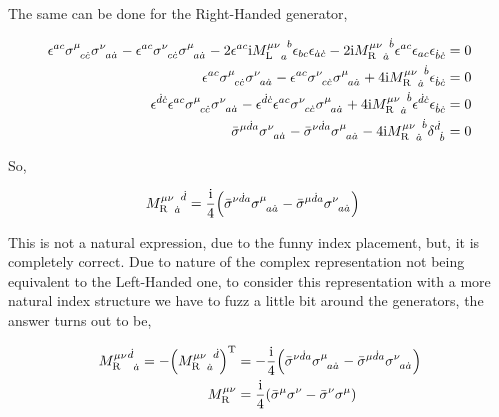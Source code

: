 The same can be done for the Right-Handed generator,

\begin{align}
    \epsilon^{ac}\tensor{\sigma}{^\mu_c_{\dot c}}\tensor{\sigma}{^\nu_a_{\dot a}}- \epsilon^{ac}\tensor{\sigma}{^\nu_c_{\dot c}}\tensor{\sigma}{^\mu_a_{\dot a}}-2\epsilon^{ac}\im\tensor{{{M_{\textnormal L}^{\mu\nu}}}}{_a^b}\epsilon_{bc}\epsilon_{\dot a\dot c}-2\im\tensor{{{M_{\textnormal R}^{\mu\nu}}}}{_{\dot a}^{\dot b}}\epsilon^{ac}\epsilon_{ac}\epsilon_{\dot b\dot c}&=0\nonumber\\
    \epsilon^{ac}\tensor{\sigma}{^\mu_c_{\dot c}}\tensor{\sigma}{^\nu_a_{\dot a}}- \epsilon^{ac}\tensor{\sigma}{^\nu_c_{\dot c}}\tensor{\sigma}{^\mu_a_{\dot a}}+4\im\tensor{{{M_{\textnormal R}^{\mu\nu}}}}{_{\dot a}^{\dot b}}\epsilon_{\dot b\dot c}&=0\nonumber\\
    \epsilon^{\dot d\dot c}\epsilon^{ac}\tensor{\sigma}{^\mu_c_{\dot c}}\tensor{\sigma}{^\nu_a_{\dot a}}- \epsilon^{\dot d\dot c}\epsilon^{ac}\tensor{\sigma}{^\nu_c_{\dot c}}\tensor{\sigma}{^\mu_a_{\dot a}}+4\im\tensor{{{M_{\textnormal R}^{\mu\nu}}}}{_{\dot a}^{\dot b}}\epsilon^{\dot d\dot c}\epsilon_{\dot b\dot c}&=0\nonumber\\
    \tensor{{\bar\sigma}}{^\mu^{\dot d}^a}\tensor{\sigma}{^\nu_a_{\dot a}}-\tensor{{\bar\sigma}}{^\nu^{\dot d}^a}\tensor{\sigma}{^\mu_a_{\dot a}}-4\im\tensor{{{M_{\textnormal R}^{\mu\nu}}}}{_{\dot a}^{\dot b}}\tensor{\delta}{^{\dot d}_{\dot b}}&=0\nonumber
\end{align}

So,

\begin{align}
    \tensor{{{M_{\textnormal R}^{\mu\nu}}}}{_{\dot a}^{\dot d}}&=\frac\im 4\qty(\tensor{{\bar\sigma}}{^\nu^{\dot d}^a}\tensor{\sigma}{^\mu_a_{\dot a}}-\tensor{{\bar\sigma}}{^\mu^{\dot d}^a}\tensor{\sigma}{^\nu_a_{\dot a}})\nonumber
\end{align}

This is not a natural expression, due to the funny index placement, but, it is completely correct. Due to nature of the complex representation not being equivalent to the Left-Handed one, to consider this representation with a more natural index structure we have to fuzz a little bit around the generators, the answer turns out to be,

\begin{align}
    \tensor{{M_{\textnormal R}^{\mu\nu}}}{^{\dot d}_{\dot a}}=-\qty(\tensor{{{M_{\textnormal R}^{\mu\nu}}}}{_{\dot a}^{\dot d}})^{\textnormal T}&=-\frac\im 4\qty(\tensor{{\bar\sigma}}{^\nu^{\dot d}^a}\tensor{\sigma}{^\mu_a_{\dot a}}-\tensor{{\bar\sigma}}{^\mu^{\dot d}^a}\tensor{\sigma}{^\nu_a_{\dot a}})\nonumber\\
    M_{\textnormal R}^{\mu\nu}&=\frac\im 4\qty(\tensor{{\bar\sigma}}{^\mu}\tensor{\sigma}{^\nu}-\tensor{{\bar\sigma}}{^\nu}\tensor{\sigma}{^\mu})\nonumber
\end{align}

